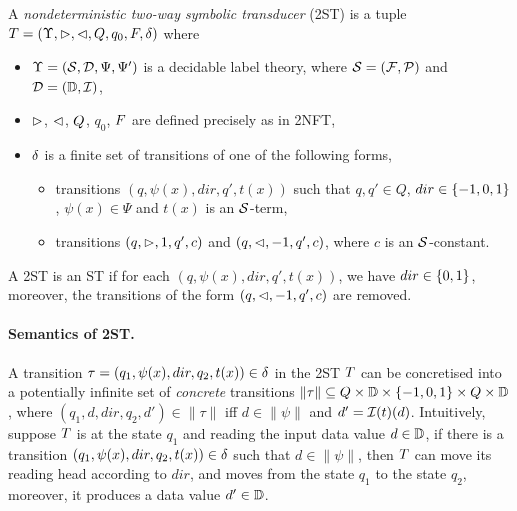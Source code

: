 \begin{definition}
    A \emph{nondeterministic two-way  symbolic \emph{transducer}} (2ST) is a tuple $T = (\Upsilon, \vartriangleright, \vartriangleleft, Q, q_0, F, \delta)$ where  
\begin{itemize}
\item $\Upsilon=(\mathcal{S}, \mathcal{D}, \Psi, \Psi')$ is a decidable label theory, where $\mathcal{S} = ({\mathcal{F}}, {\mathcal{P}})$ and $\mathcal{D} = (\mathbb{D}, \mathcal{I})$,
%
\item $\vartriangleright$, $\vartriangleleft$, $Q$, $q_0$, $F$ are defined precisely as in 2NFT, 
%
\item $\delta$ is a finite set of  transitions of one of the following forms,
\begin{itemize}
\item   transitions $(q, \psi(x), dir, q', t(x))$ such that $q, q' \in Q$, $dir \in \{-1, 0, 1\}$, $\psi(x) \in \Psi$ and
$t(x)$ is an $\mathcal{S}$-term, 
\item   transitions $(q, \vartriangleright, 1, q', c)$ and $(q, \vartriangleleft, -1, q', c)$, where $c$ is an $\mathcal{S}$-constant. 
\end{itemize}
\end{itemize}
A 2ST is an ST if for each $(q, \psi(x), dir, q', t(x))$, we have $dir \in \{0, 1\}$, moreover, the transitions of the form $(q, \vartriangleleft, -1, q', c)$ are removed.
\end{definition}

\paragraph{Semantics of 2ST.}
A transition $\tau=(q_1,\psi(x), dir, q_2, t(x)) \in \delta$ in the 2ST $T$ can be concretised
into a potentially infinite set of \emph{concrete} transitions $\|\tau\| \subseteq Q \times \mathbb{D} \times \{-1, 0, 1\} \times Q \times \mathbb{D}$, where $(q_1, d, dir, q_2, d')  \in \|\tau\|$ iff $d \in \|\psi\|$ and $d' = \mathcal{I}(t)(d)$.
Intuitively, suppose $T$ is at the state $q_1$ and reading the input data value $d \in \mathbb{D}$,
if there is a transition $(q_1, \psi(x), dir, q_2, t(x) )\in \delta$ such that $d \in \|\psi\|$, then $T$ can move its reading head according to $dir$, and moves from the state
$q_1$ to the state $q_2$, moreover, it produces a data value $d' \in \mathbb{D}$.

